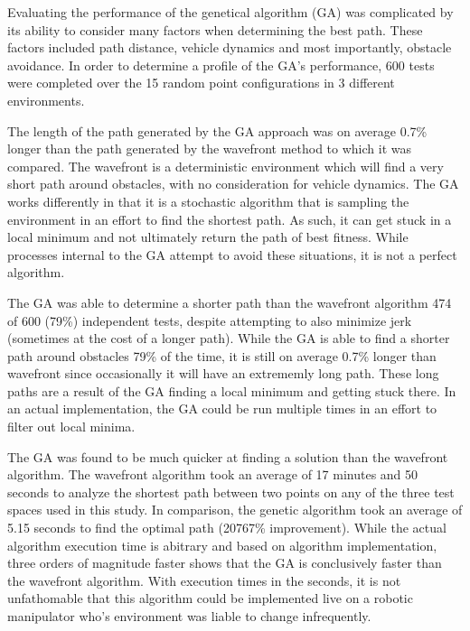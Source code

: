 	

Evaluating the performance of the genetical algorithm (GA) was complicated by its ability to consider many factors when determining the best path. These factors included path distance, vehicle dynamics and most importantly, obstacle avoidance. In order to determine a profile of the GA's performance, 600 tests were completed over the 15 random point configurations in 3 different environments.

The length of the path generated by the GA approach was on average 0.7\% longer than the path generated by the wavefront method to which it was compared. The wavefront is a deterministic environment which will find a very short path around obstacles, with no consideration for vehicle dynamics. The GA works differently in that it is a stochastic algorithm that is sampling the environment in an effort to find the shortest path. As such, it can get stuck in a local minimum and not ultimately return the path of best fitness. While processes internal to the GA attempt to avoid these situations, it is not a perfect algorithm.

The GA was able to determine a shorter path than the wavefront algorithm 474 of 600 (79\%) independent tests, despite attempting to also minimize jerk (sometimes at the cost of a longer path). While the GA is able to find a shorter path around obstacles 79\% of the time, it is still on average 0.7\% longer than wavefront since occasionally it will have an extrememly long path. These long paths are a result of the GA finding a local minimum and getting stuck there. In an actual implementation, the GA could be run multiple times in an effort to filter out local minima.

The GA was found to be much quicker at finding a solution than the wavefront algorithm. The wavefront algorithm took an average of 17 minutes and 50 seconds to analyze the shortest path between two points on any of the three test spaces used in this study. In comparison, the genetic algorithm took an average of 5.15 seconds to find the optimal path (20767\% improvement). While the actual algorithm execution time is abitrary and based on algorithm implementation, three orders of magnitude faster shows that the GA is conclusively faster than the wavefront algorithm. With execution times in the seconds, it is not unfathomable that this algorithm could be implemented live on a robotic manipulator who's environment was liable to change infrequently.


